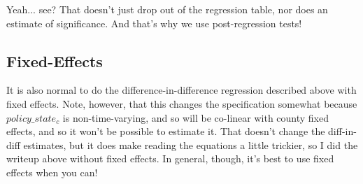 \documentclass[12pt]{article}
\begin{document}
Yeah... see? That doesn't just drop out of the regression table, nor does an estimate of significance. And that's why we use post-regression tests!

\subsection*{Fixed-Effects}

It is also normal to do the difference-in-difference regression described above with fixed effects. Note, however, that this changes the specification somewhat because $policy\_state_{c}$ is non-time-varying,  and so will be co-linear with county fixed effects, and so it won't be possible to estimate it. That doesn't change the diff-in-diff estimates, but it does make reading the equations a little trickier, so I did the writeup above without fixed effects. In general, though, it's best to use fixed effects when you can!
\end{document}
